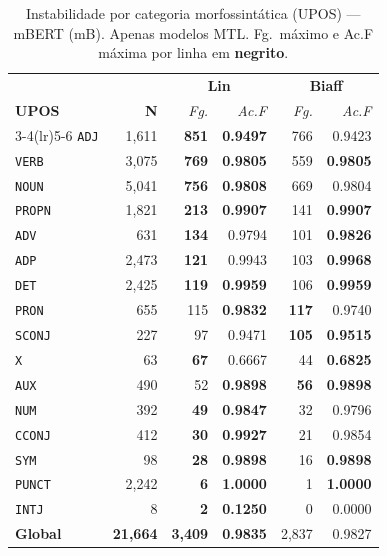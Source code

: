 \clearpage
\begin{table}[p]
\centering
\caption{Instabilidade por categoria morfossint\'atica (UPOS) --- mBERT (mB).
Apenas modelos MTL. Fg.\ m\'aximo e Ac.F m\'axima por linha em \textbf{negrito}.}
\label{tab:instab-mb-upos}
\begingroup
\small\setlength{\tabcolsep}{6pt}\renewcommand{\arraystretch}{1.2}%
\begin{tabular}{l r| r r| r r}
\toprule
\multicolumn{2}{c|}{}
  & \multicolumn{2}{c|}{\textbf{Lin}}
  & \multicolumn{2}{c}{\textbf{Biaff}} \\
\textbf{UPOS} & \textbf{N}
  & \textit{Fg.} & \textit{Ac.F}
  & \textit{Fg.} & \textit{Ac.F} \\
\cmidrule(lr){3-4}\cmidrule(lr){5-6}
  \texttt{ADJ} & 1,611 & \textbf{851} & \textbf{0.9497} & 766 & 0.9423 \\
  \texttt{VERB} & 3,075 & \textbf{769} & \textbf{0.9805} & 559 & \textbf{0.9805} \\
  \texttt{NOUN} & 5,041 & \textbf{756} & \textbf{0.9808} & 669 & 0.9804 \\
  \texttt{PROPN} & 1,821 & \textbf{213} & \textbf{0.9907} & 141 & \textbf{0.9907} \\
  \texttt{ADV} & 631 & \textbf{134} & 0.9794 & 101 & \textbf{0.9826} \\
  \texttt{ADP} & 2,473 & \textbf{121} & 0.9943 & 103 & \textbf{0.9968} \\
  \texttt{DET} & 2,425 & \textbf{119} & \textbf{0.9959} & 106 & \textbf{0.9959} \\
  \texttt{PRON} & 655 & 115 & \textbf{0.9832} & \textbf{117} & 0.9740 \\
  \texttt{SCONJ} & 227 & 97 & 0.9471 & \textbf{105} & \textbf{0.9515} \\
  \texttt{X} & 63 & \textbf{67} & 0.6667 & 44 & \textbf{0.6825} \\
  \texttt{AUX} & 490 & 52 & \textbf{0.9898} & \textbf{56} & \textbf{0.9898} \\
  \texttt{NUM} & 392 & \textbf{49} & \textbf{0.9847} & 32 & 0.9796 \\
  \texttt{CCONJ} & 412 & \textbf{30} & \textbf{0.9927} & 21 & 0.9854 \\
  \texttt{SYM} & 98 & \textbf{28} & \textbf{0.9898} & 16 & \textbf{0.9898} \\
  \texttt{PUNCT} & 2,242 & \textbf{6} & \textbf{1.0000} & 1 & \textbf{1.0000} \\
  \texttt{INTJ} & 8 & \textbf{2} & \textbf{0.1250} & 0 & 0.0000 \\
\midrule
  \textbf{Global} & \textbf{21,664} & \textbf{3,409} & \textbf{0.9835} & 2,837 & 0.9827 \\
\bottomrule
\end{tabular}
\endgroup
\instablegendaMTL
\end{table}


